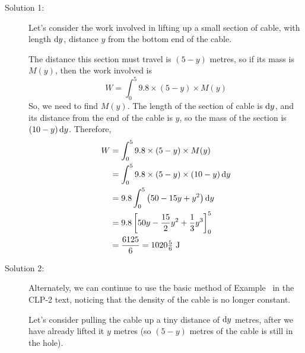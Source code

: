 \begin{solution}
\begin{description}
\item[Solution 1:]
Let's consider the work involved in lifting up a small section of cable, with length $\mathrm{d}y$, distance $y$ from the bottom end of the cable.

\begin{center}
\end{center}



 The distance this section must travel is $(5-y)$ metres, so if its mass is $M(y)$, then the work involved is
\[W = \int_0^5 9.8 \times (5-y)\times M(y)\]
So, we need to find $M(y)$. The length of the section of cable is $\mathrm{d}y$, and its distance from the end of the cable is $y$, so the mass of the section is $(10-y)\,\mathrm{d}y$. Therefore,
\begin{align*}
W &= \int_0^5 9.8 \times (5-y)\times M(y)\\
&= \int_0^5 9.8 \times (5-y)\times (10-y)\,\mathrm{d}y\\
&=9.8\int_0^5 \big(50-15y+y^2\big)\,\mathrm{d}y\\
&=9.8\left[50y-\frac{15}{2}y^2+\frac{1}{3}y^3\right]_0^5\\
&=\frac{6125}{6} = 1020\tfrac{5}{6}\ \text{J}
\end{align*}
\item[Solution 2:]
Alternately, we can continue to use the basic method of Example~ in the CLP-2 text, noticing that the density of the cable is no longer constant.

Let's consider pulling the cable up a tiny distance of $\mathrm{d}y$ metres, after we have already lifted it $y$ metres (so  $(5-y)$ metres of the cable is still in the hole).


\end{description}
\end{solution}
